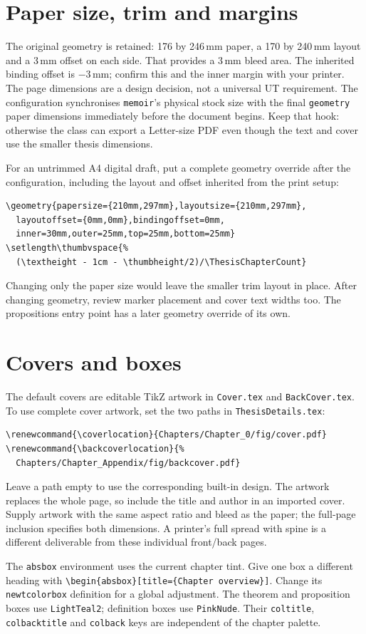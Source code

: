 \section{Paper size, trim and margins}
The original geometry is retained: 176 by 246\,mm paper, a 170 by 240\,mm
layout and a 3\,mm offset on each side. That provides a 3\,mm bleed area.
The inherited binding offset is $-3$\,mm; confirm this and the inner margin
with your printer. The page dimensions are a design decision, not a universal
UT requirement. The configuration synchronises \texttt{memoir}'s physical
stock size with the final \texttt{geometry} paper dimensions immediately before
the document begins. Keep that hook: otherwise the class can export a Letter-size
PDF even though the text and cover use the smaller thesis dimensions.

For an untrimmed A4 digital draft, put a complete geometry override after the
configuration, including the layout and offset inherited from the print setup:
\begin{lstlisting}
\geometry{papersize={210mm,297mm},layoutsize={210mm,297mm},
  layoutoffset={0mm,0mm},bindingoffset=0mm,
  inner=30mm,outer=25mm,top=25mm,bottom=25mm}
\setlength\thumbvspace{%
  (\textheight - 1cm - \thumbheight/2)/\ThesisChapterCount}
\end{lstlisting}
Changing only the paper size would leave the smaller trim layout in place.
After changing geometry, review marker placement and cover text widths too.
The propositions entry point has a later geometry override of its own.

\section{Covers and boxes}
The default covers are editable TikZ artwork in \texttt{Cover.tex} and
\texttt{BackCover.tex}. To use complete cover artwork, set the two paths in
\texttt{ThesisDetails.tex}:
\begin{lstlisting}
\renewcommand{\coverlocation}{Chapters/Chapter_0/fig/cover.pdf}
\renewcommand{\backcoverlocation}{%
  Chapters/Chapter_Appendix/fig/backcover.pdf}
\end{lstlisting}
Leave a path empty to use the corresponding built-in design. The artwork
replaces the whole page, so include the title and author in an imported cover.
Supply artwork with the same aspect ratio and bleed as the paper; the full-page
inclusion specifies both dimensions. A printer's full spread with spine is a
different deliverable from these individual front/back pages.

The \texttt{absbox} environment uses the current chapter tint. Give one box a
different heading with \verb|\begin{absbox}[title={Chapter overview}]|.
Change its \texttt{newtcolorbox} definition for a global adjustment.
The theorem and proposition boxes use \texttt{LightTeal2}; definition boxes use
\texttt{PinkNude}. Their \texttt{coltitle}, \texttt{colbacktitle} and
\texttt{colback} keys are independent of the chapter palette.
